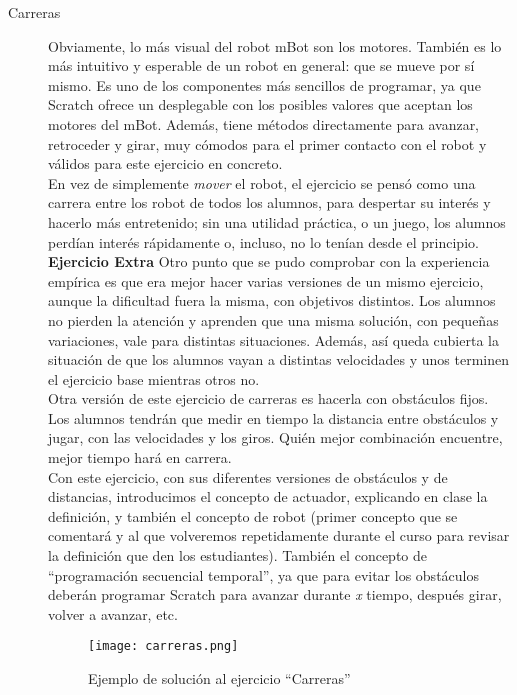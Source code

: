 \begin{description}

\item [Carreras]\label{ej:carreras}
Obviamente, lo más visual del robot mBot son los motores. También es lo más intuitivo y esperable de un robot en general: que se mueve por sí mismo. Es uno de los componentes más sencillos de programar, ya que Scratch ofrece un desplegable con los posibles valores que aceptan los motores del mBot. Además, tiene métodos directamente para avanzar, retroceder y girar, muy cómodos para el primer contacto con el robot y válidos para este ejercicio en concreto. \\
En vez de simplemente \textit{mover} el robot, el ejercicio se pensó como una carrera entre los robot de todos los alumnos, para despertar su interés y hacerlo más entretenido; sin una utilidad práctica, o un juego, los alumnos perdían interés rápidamente o, incluso, no lo tenían desde el principio. \\
\textbf{Ejercicio Extra} Otro punto que se pudo comprobar con la experiencia empírica es que era mejor hacer varias versiones de un mismo ejercicio, aunque la dificultad fuera la misma, con objetivos distintos. Los alumnos no pierden la atención y aprenden que una misma solución, con pequeñas variaciones, vale para distintas situaciones. Además, así queda cubierta la situación de que los alumnos vayan a distintas velocidades y unos terminen el ejercicio base mientras otros no.\\
Otra versión de este ejercicio de carreras es hacerla con obstáculos fijos. Los alumnos tendrán que medir en tiempo la distancia entre obstáculos y jugar, con las velocidades y los giros. Quién mejor combinación encuentre, mejor tiempo hará en carrera.\\
Con este ejercicio, con sus diferentes versiones de obstáculos y de distancias, introducimos el concepto de actuador, explicando en clase la definición, y también el concepto de robot (primer concepto que se comentará y al que volveremos repetidamente durante el curso para revisar la definición que den los estudiantes). También el concepto de ``programación secuencial temporal'', ya que para evitar los obstáculos deberán programar Scratch para avanzar durante \textit{x} tiempo, después girar, volver a avanzar, etc.
\begin{figure}[h]
	\centering
	\texttt{[image: carreras.png]}
	\label{img:carreras}
	\caption{Ejemplo de solución al ejercicio ``Carreras''}
\end{figure}

\end{description}

